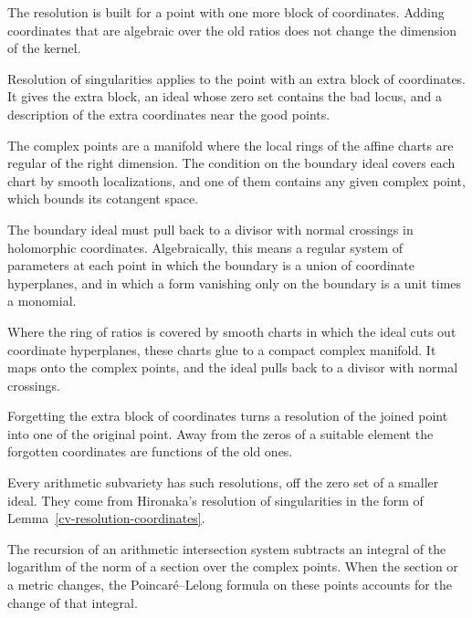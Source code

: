 The resolution is built for a point with one more block of coordinates. Adding coordinates that are algebraic over the
old ratios does not change the dimension of the kernel.

Resolution of singularities applies to the point with an extra block of coordinates. It gives the extra block, an ideal
whose zero set contains the bad locus, and a description of the extra coordinates near the good points.

The complex points are a manifold where the local rings of the affine charts are regular of the right dimension. The
condition on the boundary ideal covers each chart by smooth localizations, and one of them contains any given complex
point, which bounds its cotangent space.

The boundary ideal must pull back to a divisor with normal crossings in holomorphic coordinates. Algebraically, this
means a regular system of parameters at each point in which the boundary is a union of coordinate hyperplanes, and in
which a form vanishing only on the boundary is a unit times a monomial.

Where the ring of ratios is covered by smooth charts in which the ideal cuts out coordinate hyperplanes, these charts
glue to a compact complex manifold. It maps onto the complex points, and the ideal pulls back to a divisor with normal
crossings.

Forgetting the extra block of coordinates turns a resolution of the joined point into one of the original point. Away
from the zeros of a suitable element the forgotten coordinates are functions of the old ones.

Every arithmetic subvariety has such resolutions, off the zero set of a smaller ideal. They come from Hironaka's
resolution of singularities in the form of Lemma~\ref{cv-resolution-coordinates}.

The recursion of an arithmetic intersection system subtracts an integral of the logarithm of the norm of a section
over the complex points. When the section or a metric changes, the Poincar\'e--Lelong formula on these points
accounts for the change of that integral.

